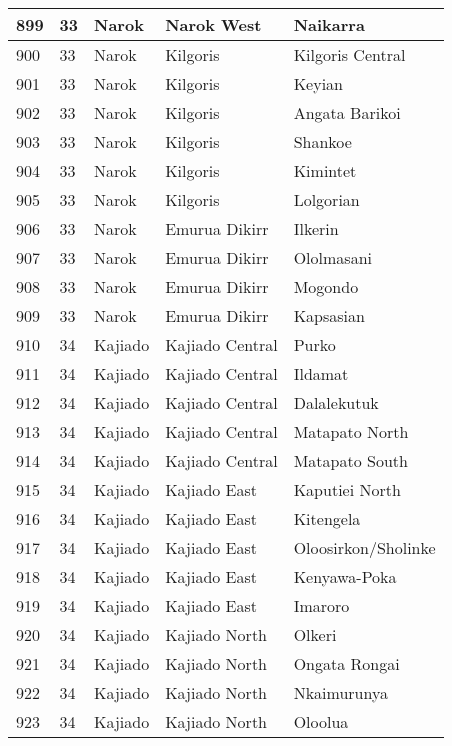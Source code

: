\begin{table}[!ht]
\begin{tabular}{|l|l|l|l|l|}
        899 & 33 & Narok & Narok West & Naikarra \\ \hline
        900 & 33 & Narok & Kilgoris & Kilgoris Central \\ \hline
        901 & 33 & Narok & Kilgoris & Keyian \\ \hline
        902 & 33 & Narok & Kilgoris & Angata Barikoi \\ \hline
        903 & 33 & Narok & Kilgoris & Shankoe \\ \hline
        904 & 33 & Narok & Kilgoris & Kimintet \\ \hline
        905 & 33 & Narok & Kilgoris & Lolgorian \\ \hline
        906 & 33 & Narok & Emurua Dikirr & Ilkerin \\ \hline
        907 & 33 & Narok & Emurua Dikirr & Ololmasani \\ \hline
        908 & 33 & Narok & Emurua Dikirr & Mogondo \\ \hline
        909 & 33 & Narok & Emurua Dikirr & Kapsasian \\ \hline
        910 & 34 & Kajiado & Kajiado Central & Purko \\ \hline
        911 & 34 & Kajiado & Kajiado Central & Ildamat \\ \hline
        912 & 34 & Kajiado & Kajiado Central & Dalalekutuk \\ \hline
        913 & 34 & Kajiado & Kajiado Central & Matapato North \\ \hline
        914 & 34 & Kajiado & Kajiado Central & Matapato South \\ \hline
        915 & 34 & Kajiado & Kajiado East & Kaputiei North \\ \hline
        916 & 34 & Kajiado & Kajiado East & Kitengela \\ \hline
        917 & 34 & Kajiado & Kajiado East & Oloosirkon/Sholinke \\ \hline
        918 & 34 & Kajiado & Kajiado East & Kenyawa-Poka \\ \hline
        919 & 34 & Kajiado & Kajiado East & Imaroro \\ \hline
        920 & 34 & Kajiado & Kajiado North & Olkeri \\ \hline
        921 & 34 & Kajiado & Kajiado North & Ongata Rongai \\ \hline
        922 & 34 & Kajiado & Kajiado North & Nkaimurunya \\ \hline
        923 & 34 & Kajiado & Kajiado North & Oloolua \\ \hline

\end{tabular}
\end{table}
